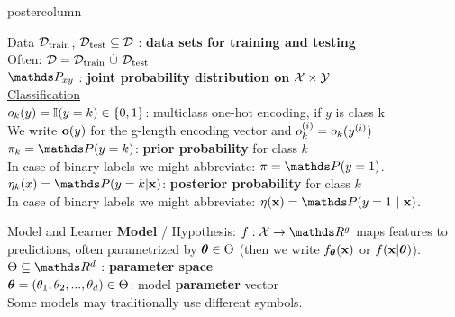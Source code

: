 \documentclass{beamer}
\begin{document}
\begin{frame}[fragile]{}
\begin{columns}
\begin{column}{.31\textwidth}
\begin{beamercolorbox}[center]{postercolumn}
\begin{minipage}{.98\textwidth}
{\begin{myblock}{Data}
$\mathcal{D}_{\text{train}}$, $\mathcal{D}_{\text{test}} \subseteq \mathcal{D}$ : \textbf{data sets for training and testing} \\ 
Often: $\mathcal{D} = \mathcal{D}_{\text{train}} ~ \dot{\cup} ~ \mathcal{D}_{\text{test}}$\\
 

$\P_{xy}$ : \textbf{joint probability distribution on} $\mathcal{X} \times \mathcal{Y}$ \\


\underline{Classification}\\

$o_k(y) = \mathbb{I}(y = k) \in \{0,1\}$: multiclass one-hot encoding, if $y$ is class k\\ 
We write $\bold{o}(y)$ for the g-length encoding vector and $o_k^{(i)} =  o_k(y^{(i)})$\\

$\pi_k = \P(y = k)$:\textbf{ prior probability} for class $k$ \\
In case of binary labels we might abbreviate: $\pi = \P(y = 1)$.\\

$\eta_k(x) = \P(y = k| \xv)$: \textbf{posterior probability} for class $k$\\
In case of binary labels we might abbreviate: $\eta(\xv) = \P(y = 1 ~|~ \xv)$.
  
\end{myblock}
\begin{myblock}{Model and Learner}
    \textbf{Model} / Hypothesis: $f : \Xspace \rightarrow \R^g$ maps features to predictions, often parametrized by $\bm{\theta} \in \Theta$ (then we write $f_{\bm{\theta}}(\mathbf{x})$ or $f(\mathbf{x} | \bm{\theta})$). \\


$\Theta \subseteq \R^d$ : \textbf{parameter space} \\
  
$\bm{\theta} = (\theta_1, \theta_2, ..., \theta_d) \in \Theta$: model \textbf{parameter} vector\\
Some models may traditionally use different symbols. \\


\end{myblock}}
\end{minipage}
\end{beamercolorbox}
\end{column}
\end{columns}
\end{frame}
\end{document}
